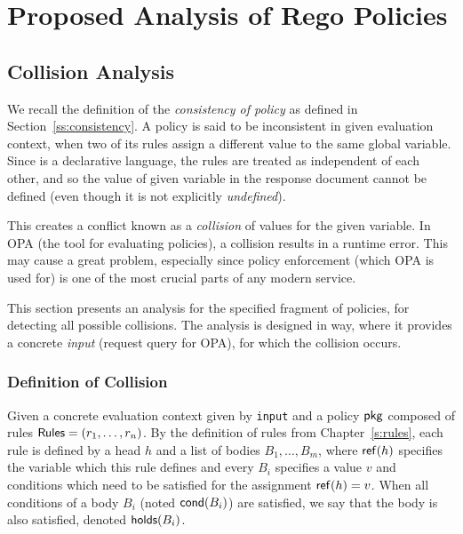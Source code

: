 \chapter{Proposed Analysis of Rego Policies}
\label{ch:analysis}


\section{Collision Analysis}
\label{s:collision}

We recall the definition of the \emph{consistency of policy} as defined in Section~\ref{ss:consistency}.
A policy is said to be inconsistent in given evaluation context, when two of its rules assign a different value to the same global variable.
Since \rego is a declarative language, the rules are treated as independent of each other, and so the value of given variable in the response document cannot be defined (even though it is not explicitly \emph{undefined}).

This creates a conflict known as a \emph{collision} of values for the given variable.
In OPA (the tool for evaluating \rego policies), a collision results in a runtime error.
This may cause a great problem, especially since policy enforcement (which OPA is used for) is one of the most crucial parts of any modern service.

This section presents an analysis for the specified fragment of \rego policies, for detecting all possible collisions.
The analysis is designed in way, where it provides a concrete \emph{input} (request query for OPA), for which the collision occurs.


\subsection{Definition of Collision}

Given a concrete evaluation context given by \texttt{input} and a policy $\mathsf{pkg}$ composed of rules $\mathsf{Rules} = (r_1,\ldots,r_n)$.
By the definition of rules from Chapter~\ref{s:rules}, each rule is defined by a head $h$ and a list of bodies $B_1,\ldots,B_m$, where $\mathsf{ref}(h)$ specifies the variable which this rule defines and every $B_i$ specifies a value $v$ and conditions which need to be satisfied for the assignment $\mathsf{ref}(h) = v$.
When all conditions of a body $B_i$ (noted $\mathsf{cond}(B_i)$) are satisfied, we say that the body is also satisfied, denoted $\mathsf{holds}(B_i)$.

